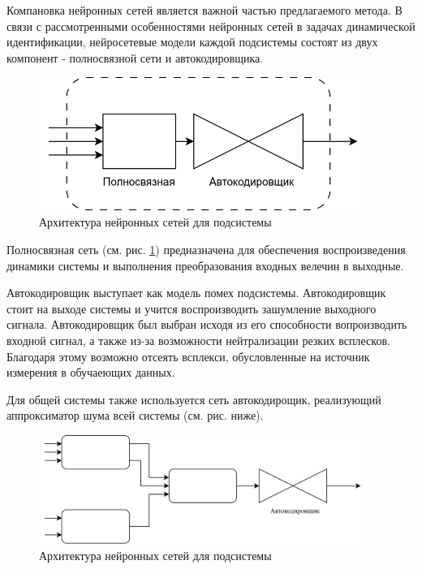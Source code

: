 Компановка нейронных сетей является важной частью предлагаемого метода. В связи с рассмотренными особенностями нейронных сетей в задачах динамической идентификации, нейросетевые модели каждой подсистемы состоят из двух компонент - полносвязной сети и автокодировщика. 

\begin{figure}[H]
  \begin{center}
    \includegraphics[width=0.95\textwidth]{figures/nn_system.png}
  \end{center}
  \caption{Архитектура нейронных сетей для подсистемы}\label{fig:nn:system}
\end{figure}

Полносвязная сеть (см. рис. \ref{fig:nn:system}) предназначена для обеспечения воспроизведения динамики системы и выполнения преобразования входных велечин в выходные. 

Автокодировщик выступает как модель помех подсистемы. Автокодировщик стоит на выходе системы и учится воспроизводить зашумление выходного сигнала. Автокодировщик был выбран исходя из его способности вопроизводить входной сигнал, а также из-за возможности нейтрализации резких всплесков. Благодаря этому возможно отсеять всплекси, обусловленные на источник измерения в обучаеющих данных. 


Для общей системы также используется сеть автокодирощик, реализующий аппроксиматор шума всей системы (см. рис. ниже).

\begin{figure}[H]
  \begin{center}
    \includegraphics[width=0.95\textwidth]{figures/nn_full.png}
  \end{center}
  \caption{Архитектура нейронных сетей для подсистемы}\label{fig:nn:full}
\end{figure}

